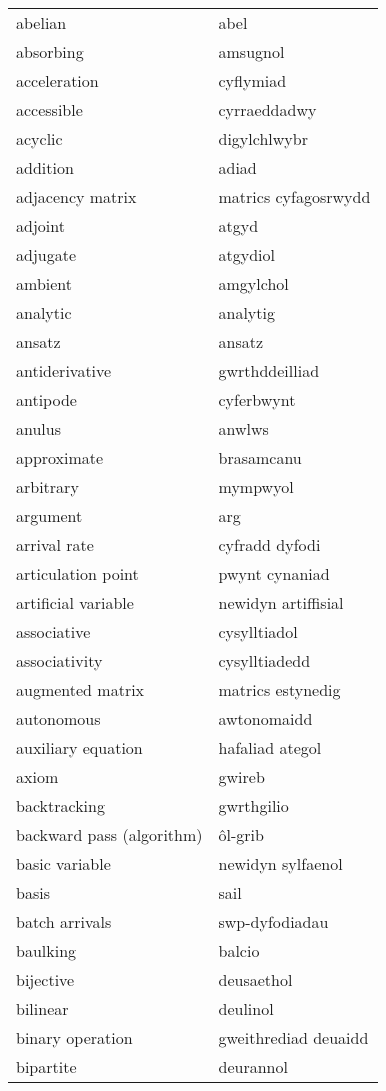 \begin{supertabular}{p{0.22\textwidth}p{0.22\textwidth}}
\midrule
abelian & abel \\
absorbing & amsugnol \\
acceleration & cyflymiad \\
accessible & cyrraeddadwy \\
acyclic & digylchlwybr \\
addition & adiad \\
adjacency matrix & matrics cyfagosrwydd \\
adjoint & atgyd \\
adjugate & atgydiol \\
ambient & amgylchol \\
analytic & analytig \\
ansatz & ansatz \\
antiderivative & gwrthddeilliad \\
antipode & cyferbwynt \\
anulus & anwlws \\
approximate & brasamcanu \\
arbitrary & mympwyol \\
argument & arg \\
arrival rate & cyfradd dyfodi \\
articulation point & pwynt cynaniad \\
artificial variable & newidyn artiffisial \\
associative & cysylltiadol \\
associativity & cysylltiadedd \\
augmented matrix & matrics estynedig \\
autonomous & awtonomaidd \\
auxiliary equation & hafaliad ategol \\
axiom & gwireb \\
backtracking & gwrthgilio \\
backward pass (algorithm) & ôl-grib \\
basic variable & newidyn sylfaenol \\
basis & sail \\
batch arrivals & swp-dyfodiadau \\
baulking & balcio \\
bijective & deusaethol \\
bilinear & deulinol \\
binary operation & gweithrediad deuaidd \\
bipartite & deurannol \\

\end{supertabular}

